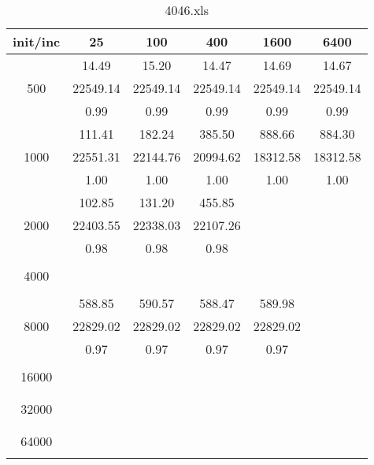 \begin{table}[th]
\caption{4046.xls}
\label{tab:4046.xls}
\centering
\begin{tabular}{|c||c|c|c|c|c|}
\hline
init/inc & 25 & 100 & 400 & 1600 & 6400 \\ \hline \hline
  & 14.49 & 15.20 & 14.47 & 14.69 & 14.67\\ 
500  & 22549.14 & 22549.14 & 22549.14 & 22549.14 & 22549.14\\ 
  & 0.99 & 0.99 & 0.99 & 0.99 & 0.99\\ \hline 
  & 111.41 & 182.24 & 385.50 & 888.66 & 884.30\\ 
1000  & 22551.31 & 22144.76 & 20994.62 & 18312.58 & 18312.58\\ 
  & 1.00 & 1.00 & 1.00 & 1.00 & 1.00\\ \hline 
  & 102.85 & 131.20 & 455.85 &  & \\ 
2000  & 22403.55 & 22338.03 & 22107.26 &  & \\ 
  & 0.98 & 0.98 & 0.98 &  & \\ \hline 
  &  &  &  &  & \\ 
4000  &  &  &  &  & \\ 
  &  &  &  &  & \\ \hline 
  & 588.85 & 590.57 & 588.47 & 589.98 & \\ 
8000  & 22829.02 & 22829.02 & 22829.02 & 22829.02 & \\ 
  & 0.97 & 0.97 & 0.97 & 0.97 & \\ \hline 
  &  &  &  &  & \\ 
16000  &  &  &  &  & \\ 
  &  &  &  &  & \\ \hline 
  &  &  &  &  & \\ 
32000  &  &  &  &  & \\ 
  &  &  &  &  & \\ \hline 
  &  &  &  &  & \\ 
64000  &  &  &  &  & \\ 
  &  &  &  &  & \\ \hline 
\end{tabular}
\end{table}
\cleardoublepage

